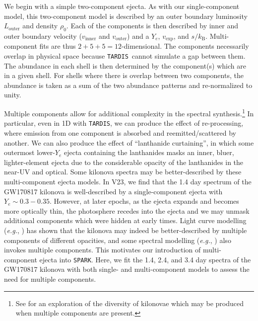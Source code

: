 \documentclass[twocolumn,twocolappendix]{aastex63}
\def\SPARK{\texttt{SPARK}}
\def\TARDIS{\texttt{TARDIS}}
\def\eg{{\it e.g.}}
\begin{document}
We begin with a simple two-component ejecta. As with our single-component model, this two-component model is described by an outer boundary luminosity $L_{\mathrm{outer}}$ and density $\rho_0$. Each of the components is then described by inner and outer boundary velocity ($v_{\mathrm{inner}}$ and $v_{\mathrm{outer}}$) and a $Y_e$, $v_{\mathrm{exp}}$, and $s / k_{\mathrm{B}}$. Multi-component fits are thus $2 + 5 + 5 = 12$-dimensional. The components necessarily overlap in physical space because \TARDIS~cannot simulate a gap between them. The abundance in each shell is then determined by the component(s) which are in a given shell. For shells where there is overlap between two components, the abundance is taken as a sum of the two abundance patterns and re-normalized to unity. %
    
Multiple components allow for additional complexity in the spectral synthesis.\footnote{See \cite{kawaguchi20} for an exploration of the diversity of kilonovae which may be produced when multiple components are present.} In particular, even in 1D with \TARDIS, we can produce the effect of re-processing, where emission from one component is absorbed and reemitted/scattered by another. We can also produce the effect of ``lanthanide curtaining'', in which some outermost lower-$Y_e$ ejecta containing the lanthanides masks an inner, bluer, lighter-element ejecta due to the considerable opacity of the lanthanides in the near-UV and optical. Some kilonova spectra may be better-described by these multi-component ejecta models. In V23, we find that the 1.4 day spectrum of the GW170817 kilonova is well-described by a single-component ejecta with $Y_e \sim 0.3-0.35$. However, at later epochs, as the ejecta expands and becomes more optically thin, the photosphere recedes into the ejecta and we may unmask additional components which were hidden at early times. Light curve modelling (\eg, \citealt{villar17}) has shown that the kilonova may indeed be better-described by multiple components of different opacities, and some spectral modelling (\eg, \citealt{kasen17}) also invokes multiple components. This motivates our introduction of multi-component ejecta into \SPARK. Here, we fit the 1.4, 2.4, and 3.4 day spectra of the GW170817 kilonova with both single- and multi-component models to assess the need for multiple components.




\end{document}
